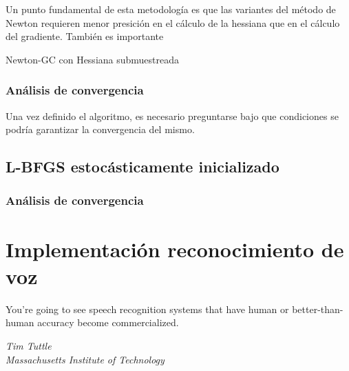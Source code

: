 \documentclass{book}
\makeatletter
\theoremstyle{plain}
\theoremstyle{definition}
\theoremstyle{remark}
\def\BState{\State\hskip-\ALG@thistlm}
\makeatother
\begin{document}
Un punto fundamental de esta metodología es que las variantes del método de Newton requieren menor presición en el cálculo de la hessiana que en el cálculo del gradiente. También es importante

\begin{algorithm}
\caption{Newton-GC con Hessiana submuestreada}\label{S-NG}
\end{algorithm}

\subsection{Análisis de convergencia}

Una vez definido el algoritmo, es necesario preguntarse bajo que condiciones se podría garantizar la convergencia del mismo. 

\section{L-BFGS estocásticamente inicializado}




\subsection{Análisis de convergencia}

\chapter{Implementación \small{reconocimiento de voz}}
\epigraph{You're going to see speech recognition systems that have human or better-than-human accuracy become commercialized.}{\textit{Tim Tuttle \\ Massachusetts Institute of Technology}}
\end{document}
